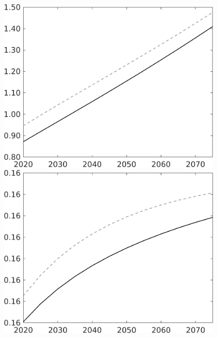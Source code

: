 \documentclass[12pt]{article}
\begin{document}
\begin{figure}
\begin{minipage}[]{0.32\textwidth}
	\end{minipage}	
	\begin{minipage}[]{0.32\textwidth}
		\includegraphics[width=1\textwidth]{../../codding_model/own_basedOnFried/optimalPol_010922_revision/figures/all_13Sept22/LevTaufNoTauf_TaulCalib_Equlab_regime0_N_spillover0_nsk0_xgr0_knspil1_sep1_LFlimit0_emsbase0_countec0_GovRev0_etaa0.79_lgd0.png}
	\end{minipage}		
	\begin{minipage}[]{0.32\textwidth}
		\includegraphics[width=1\textwidth]{../../codding_model/own_basedOnFried/optimalPol_010922_revision/figures/all_13Sept22/LevTaufNoTauf_TaulCalib_Equlab_regime0_Ln_spillover0_nsk0_xgr0_knspil1_sep1_LFlimit0_emsbase0_countec0_GovRev0_etaa0.79_lgd0.png}

\end{minipage}
\end{figure}
\end{document}
